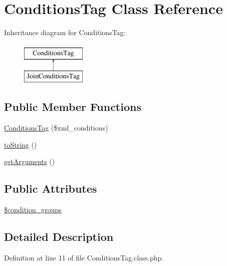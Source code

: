 \hypertarget{classConditionsTag}{\section{Conditions\-Tag Class Reference}
\label{classConditionsTag}
}
Inheritance diagram for Conditions\-Tag\-:\begin{figure}[H]
\begin{center}
\leavevmode
\includegraphics[height=2.000000cm]{classConditionsTag}
\end{center}
\end{figure}
\subsection*{Public Member Functions}
\begin{DoxyCompactItemize}
\item 
\hyperlink{classConditionsTag_ac5624e3b396995621ca7f0502dc5bd5c}{Conditions\-Tag} (\$xml\-\_\-conditions)
\item 
\hyperlink{classConditionsTag_af458fe76fa1ffb006306c682e024ee5a}{to\-String} ()
\item 
\hyperlink{classConditionsTag_a8c7e8f873db4fa6e6c35920bed31afae}{get\-Arguments} ()
\end{DoxyCompactItemize}
\subsection*{Public Attributes}
\begin{DoxyCompactItemize}
\item 
\hyperlink{classConditionsTag_a494a016d168c8e44cd05638e6c991805}{\$condition\-\_\-groups}
\end{DoxyCompactItemize}


\subsection{Detailed Description}


Definition at line 11 of file Conditions\-Tag.\-class.\-php.



